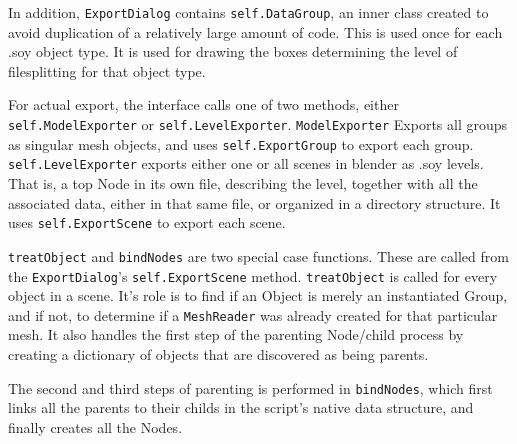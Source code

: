 In addition, \texttt{ExportDialog} contains \texttt{self.DataGroup}, an inner class created to avoid duplication of a relatively large amount of code. This is used once for each .soy object type. It is used for drawing the boxes determining the level of filesplitting for that object type.

For actual export, the interface calls one of two methods, either \\ \texttt{self.ModelExporter} or \texttt{self.LevelExporter}. \texttt{ModelExporter} Exports all groups as singular mesh objects, and uses \texttt{self.ExportGroup} to export each group. \texttt{self.LevelExporter} exports either one or all scenes in blender as .soy levels. That is, a top Node in its own file, describing the level, together with all the associated data, either in that same file, or organized in a directory structure. It uses \texttt{self.ExportScene} to export each scene.

\texttt{treatObject} and \texttt{bindNodes} are two special case functions. These are called from the \texttt{ExportDialog}'s \texttt{self.ExportScene} method. \texttt{treatObject} is called for every object in a scene. It's role is to find if an Object is merely an instantiated Group, and if not, to determine if a \texttt{MeshReader} was already created for that particular mesh. It also handles the first step of the parenting Node/child process by creating a dictionary of objects that are discovered as being parents.

The second and third steps of parenting is performed in \texttt{bindNodes}, which first links all the parents to their childs in the script's native data structure, and finally creates all the Nodes.
